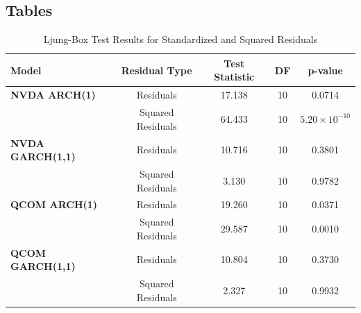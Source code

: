 \documentclass[12pt]{article}
\begin{document}
\begin{appendices}
\subsection*{Tables}

\begin{table}[h!]
	\centering
	\caption{Ljung-Box Test Results for Standardized and Squared Residuals}
	\begin{tabular}{lcccc}
		\hline
		\textbf{Model} & \textbf{Residual Type} & \textbf{Test Statistic} & \textbf{DF} & \textbf{p-value} \\
		\hline
		\textbf{NVDA ARCH(1)} & Residuals              & 17.138  & 10 & 0.0714 \\
		& Squared Residuals      & 64.433  & 10 & $5.20 \times 10^{-10}$ \\
		\textbf{NVDA GARCH(1,1)} & Residuals           & 10.716  & 10 & 0.3801 \\
		& Squared Residuals   & 3.130   & 10 & 0.9782 \\
		\textbf{QCOM ARCH(1)} & Residuals              & 19.260  & 10 & 0.0371 \\
		& Squared Residuals      & 29.587  & 10 & 0.0010 \\
		\textbf{QCOM GARCH(1,1)} & Residuals           & 10.804  & 10 & 0.3730 \\
		& Squared Residuals   & 2.327   & 10 & 0.9932 \\
		\hline
	\end{tabular}
	\label{tab:ljungbox}
\end{table}

\end{appendices}
\end{document}
